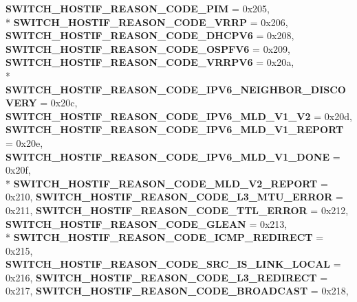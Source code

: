 \begin{DoxyCompactItemize}
{\bfseries S\+W\+I\+T\+C\+H\+\_\+\+H\+O\+S\+T\+I\+F\+\_\+\+R\+E\+A\+S\+O\+N\+\_\+\+C\+O\+D\+E\+\_\+\+P\+I\+M} = 0x205, 
\\*
{\bfseries S\+W\+I\+T\+C\+H\+\_\+\+H\+O\+S\+T\+I\+F\+\_\+\+R\+E\+A\+S\+O\+N\+\_\+\+C\+O\+D\+E\+\_\+\+V\+R\+R\+P} = 0x206, 
{\bfseries S\+W\+I\+T\+C\+H\+\_\+\+H\+O\+S\+T\+I\+F\+\_\+\+R\+E\+A\+S\+O\+N\+\_\+\+C\+O\+D\+E\+\_\+\+D\+H\+C\+P\+V6} = 0x208, 
{\bfseries S\+W\+I\+T\+C\+H\+\_\+\+H\+O\+S\+T\+I\+F\+\_\+\+R\+E\+A\+S\+O\+N\+\_\+\+C\+O\+D\+E\+\_\+\+O\+S\+P\+F\+V6} = 0x209, 
{\bfseries S\+W\+I\+T\+C\+H\+\_\+\+H\+O\+S\+T\+I\+F\+\_\+\+R\+E\+A\+S\+O\+N\+\_\+\+C\+O\+D\+E\+\_\+\+V\+R\+R\+P\+V6} = 0x20a, 
\\*
{\bfseries S\+W\+I\+T\+C\+H\+\_\+\+H\+O\+S\+T\+I\+F\+\_\+\+R\+E\+A\+S\+O\+N\+\_\+\+C\+O\+D\+E\+\_\+\+I\+P\+V6\+\_\+\+N\+E\+I\+G\+H\+B\+O\+R\+\_\+\+D\+I\+S\+C\+O\+V\+E\+R\+Y} = 0x20c, 
{\bfseries S\+W\+I\+T\+C\+H\+\_\+\+H\+O\+S\+T\+I\+F\+\_\+\+R\+E\+A\+S\+O\+N\+\_\+\+C\+O\+D\+E\+\_\+\+I\+P\+V6\+\_\+\+M\+L\+D\+\_\+\+V1\+\_\+\+V2} = 0x20d, 
{\bfseries S\+W\+I\+T\+C\+H\+\_\+\+H\+O\+S\+T\+I\+F\+\_\+\+R\+E\+A\+S\+O\+N\+\_\+\+C\+O\+D\+E\+\_\+\+I\+P\+V6\+\_\+\+M\+L\+D\+\_\+\+V1\+\_\+\+R\+E\+P\+O\+R\+T} = 0x20e, 
{\bfseries S\+W\+I\+T\+C\+H\+\_\+\+H\+O\+S\+T\+I\+F\+\_\+\+R\+E\+A\+S\+O\+N\+\_\+\+C\+O\+D\+E\+\_\+\+I\+P\+V6\+\_\+\+M\+L\+D\+\_\+\+V1\+\_\+\+D\+O\+N\+E} = 0x20f, 
\\*
{\bfseries S\+W\+I\+T\+C\+H\+\_\+\+H\+O\+S\+T\+I\+F\+\_\+\+R\+E\+A\+S\+O\+N\+\_\+\+C\+O\+D\+E\+\_\+\+M\+L\+D\+\_\+\+V2\+\_\+\+R\+E\+P\+O\+R\+T} = 0x210, 
{\bfseries S\+W\+I\+T\+C\+H\+\_\+\+H\+O\+S\+T\+I\+F\+\_\+\+R\+E\+A\+S\+O\+N\+\_\+\+C\+O\+D\+E\+\_\+\+L3\+\_\+\+M\+T\+U\+\_\+\+E\+R\+R\+O\+R} = 0x211, 
{\bfseries S\+W\+I\+T\+C\+H\+\_\+\+H\+O\+S\+T\+I\+F\+\_\+\+R\+E\+A\+S\+O\+N\+\_\+\+C\+O\+D\+E\+\_\+\+T\+T\+L\+\_\+\+E\+R\+R\+O\+R} = 0x212, 
{\bfseries S\+W\+I\+T\+C\+H\+\_\+\+H\+O\+S\+T\+I\+F\+\_\+\+R\+E\+A\+S\+O\+N\+\_\+\+C\+O\+D\+E\+\_\+\+G\+L\+E\+A\+N} = 0x213, 
\\*
{\bfseries S\+W\+I\+T\+C\+H\+\_\+\+H\+O\+S\+T\+I\+F\+\_\+\+R\+E\+A\+S\+O\+N\+\_\+\+C\+O\+D\+E\+\_\+\+I\+C\+M\+P\+\_\+\+R\+E\+D\+I\+R\+E\+C\+T} = 0x215, 
{\bfseries S\+W\+I\+T\+C\+H\+\_\+\+H\+O\+S\+T\+I\+F\+\_\+\+R\+E\+A\+S\+O\+N\+\_\+\+C\+O\+D\+E\+\_\+\+S\+R\+C\+\_\+\+I\+S\+\_\+\+L\+I\+N\+K\+\_\+\+L\+O\+C\+A\+L} = 0x216, 
{\bfseries S\+W\+I\+T\+C\+H\+\_\+\+H\+O\+S\+T\+I\+F\+\_\+\+R\+E\+A\+S\+O\+N\+\_\+\+C\+O\+D\+E\+\_\+\+L3\+\_\+\+R\+E\+D\+I\+R\+E\+C\+T} = 0x217, 
{\bfseries S\+W\+I\+T\+C\+H\+\_\+\+H\+O\+S\+T\+I\+F\+\_\+\+R\+E\+A\+S\+O\+N\+\_\+\+C\+O\+D\+E\+\_\+\+B\+R\+O\+A\+D\+C\+A\+S\+T} = 0x218, 

\end{DoxyCompactItemize}
